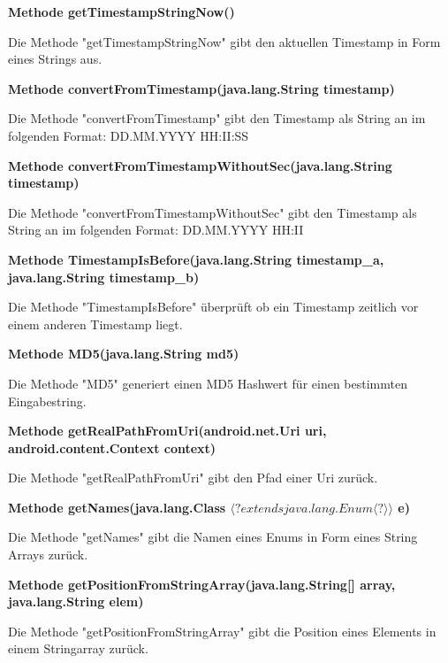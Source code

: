 \documentclass{scrartcl}
\begin{document}
\noindent\textbf{Methode getTimestampStringNow()}

\noindent Die Methode "getTimestampStringNow" gibt den aktuellen Timestamp in Form eines Strings aus. \newline 

\noindent\textbf{Methode convertFromTimestamp(java.lang.String timestamp)}

\noindent Die Methode "convertFromTimestamp" gibt den Timestamp als String an im folgenden Format: DD.MM.YYYY HH:II:SS \newline 

\noindent\textbf{Methode convertFromTimestampWithoutSec(java.lang.String timestamp)}

\noindent Die Methode "convertFromTimestampWithoutSec" gibt den Timestamp als String an im folgenden Format: DD.MM.YYYY HH:II \newline 

\noindent\textbf{Methode TimestampIsBefore(java.lang.String timestamp\_a, \newline          java.lang.String timestamp\_b)}

\noindent Die Methode "TimestampIsBefore" überprüft ob ein Timestamp zeitlich vor einem anderen Timestamp liegt. \newline

\noindent\textbf{Methode MD5(java.lang.String md5)}

\noindent Die Methode "MD5" generiert einen MD5 Hashwert für einen bestimmten Eingabestring. \newline

\noindent\textbf{Methode getRealPathFromUri(android.net.Uri uri, \newline                  android.content.Context context)}

\noindent Die Methode "getRealPathFromUri" gibt den Pfad einer Uri zurück. \newline

\noindent\textbf{Methode getNames(java.lang.Class $\langle? extends java.lang.Enum\langle?\rangle\rangle$ e)}

\noindent Die Methode "getNames" gibt die Namen eines Enums in Form eines String Arrays zurück. \newline 

\noindent\textbf{Methode getPositionFromStringArray(java.lang.String[] array, \newline
                                             java.lang.String elem)}

\noindent Die Methode "getPositionFromStringArray" gibt die Position eines Elements in einem Stringarray zurück. \newline 
\end{document}
